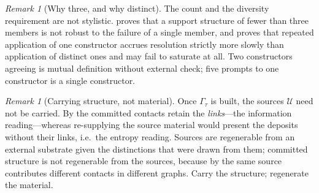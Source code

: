 \documentclass[11pt,twocolumn,a4paper]{article}
\theoremstyle{dirthm}
\theoremstyle{definition}
\theoremstyle{remark}
\newtheorem{remark}[theorem]{Remark}
\newcommand{\Gph}{\Gamma}
\newcommand{\terms}{\tau}
\begin{document}
\begin{remark}[Why three, and why distinct]
\label{rem:three-constructors}
The count and the diversity requirement are not stylistic. 
proves that a support structure of fewer than three members is not robust to
the failure of a single member, and  proves that repeated
application of one constructor accrues resolution strictly more slowly than
application of distinct ones and may fail to saturate at all. Two
constructors agreeing is mutual definition without external check; five
prompts to one constructor is a single constructor.
\end{remark}

\begin{remark}[Carrying structure, not material]
\label{rem:carry-structure}
Once $\Gph_\terms$ is built, the sources $\mathcal{U}$ need not be carried.
By  the committed contacts retain the \emph{links}---the
information reading---whereas re-supplying the source material would present
the deposits without their links, i.e.\ the entropy reading. Sources are
regenerable from an external substrate given the distinctions that were drawn
from them; committed structure is not regenerable from the sources, because
by  the same source contributes different contacts in
different graphs. Carry the structure; regenerate the material.
\end{remark}
\end{document}
